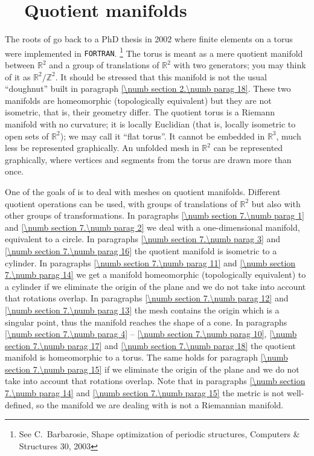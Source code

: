 
\chapter{~~Quotient manifolds}\label{\numb section 7}


The roots of {\maniFEM} go back to a PhD thesis in 2002
where finite elements on a torus were implemented in {\small\tt FORTRAN}.%
\footnote{See %
C.~Barbarosie, Shape optimization of periodic structures,
Computers \& Structures 30, 2003}
The torus is meant as a mere quotient manifold between $ \mathbb{R}^2 $ and a group of
translations of $ \mathbb{R}^2 $ with two generators;
you may think of it as $ {\mathbb R}^2/{\mathbb Z}^2 $.
It should be stressed that this manifold is not the usual ``doughnut'' built in paragraph
\ref{\numb section 2.\numb parag 18}.
These two manifolds are homeomorphic (topologically equivalent) but they are not isometric,
that is, their geometry differ.
The quotient torus is a Riemann manifold with no curvature; it is locally Euclidian
(that is, locally isometric to open sets of $ \mathbb{R}^2 $); we may call it ``flat torus''.
It cannot be embedded in $ \mathbb{R}^3 $, much less be represented graphically.
An unfolded mesh in $ \mathbb{R}^2 $ can be represented graphically, where vertices and segments
from the torus are drawn more than once.

One of the goals of {\maniFEM} is to deal with meshes on quotient manifolds.
Different quotient operations can be used, with groups of translations of $ \mathbb{R}^2 $
but also with other groups of transformations.
In paragraphs \ref{\numb section 7.\numb parag 1} and \ref{\numb section 7.\numb parag 2}
we deal with a one-dimensional manifold, equivalent to a circle.
In paragraphs \ref{\numb section 7.\numb parag 3} and \ref{\numb section 7.\numb parag 16}
the quotient manifold is isometric to a cylinder.
In paragraphs \ref{\numb section 7.\numb parag 11} and \ref{\numb section 7.\numb parag 14}
we get a manifold homeomorphic (topologically equivalent) to a cylinder
if we eliminate the origin of the plane and we do not take into account that
rotations overlap.
In paragraphs \ref{\numb section 7.\numb parag 12} and \ref{\numb section 7.\numb parag 13}
the mesh contains the origin which is a singular point, thus the manifold reaches
the shape of a cone.
In paragraphs \ref{\numb section 7.\numb parag 4} -- \ref{\numb section 7.\numb parag 10},
\ref{\numb section 7.\numb parag 17} and \ref{\numb section 7.\numb parag 18}
the quotient manifold is homeomorphic to a torus.
The same holds for paragraph \ref{\numb section 7.\numb parag 15}
if we eliminate the origin of the plane and we do not take into account that
rotations overlap.
Note that in paragraphs \ref{\numb section 7.\numb parag 14} and
\ref{\numb section 7.\numb parag 15} the metric is not well-defined,
so the manifold we are dealing with is not a Riemannian manifold.

